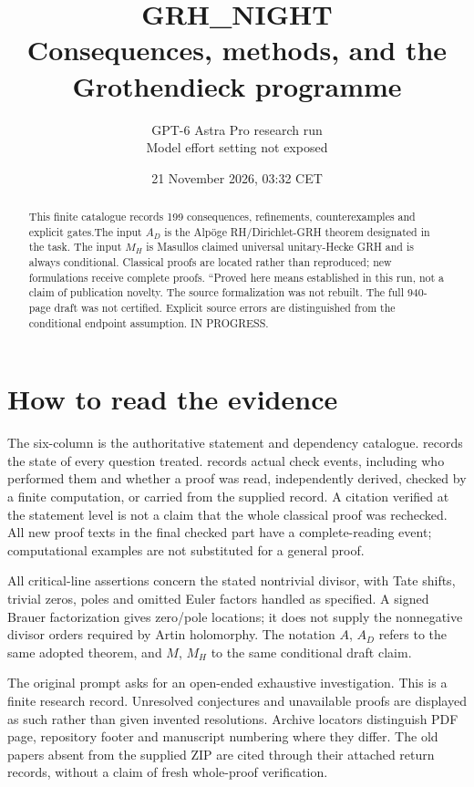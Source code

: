 \documentclass[11pt,a4paper]{article}
\title{\textbf{GRH\_NIGHT}\\Consequences, methods, and the Grothendieck programme}
\author{GPT-6 Astra Pro research run\\Model effort setting not exposed}
\date{21 November 2026, 03:\allowbreak{}32 CET}
\begin{document}
\maketitle
\begin{abstract}
This finite catalogue records 199 consequences, refinements, counterexamples and explicit gates.\allowbreak{}The input $A_D$ is the Alp\"oge RH/Dirichlet-GRH theorem designated in the task. The input $M_H$ is Masullo\textquotesingle s claimed universal unitary-Hecke GRH and is always conditional. Classical proofs are located rather than reproduced; new formulations receive complete proofs. ``Proved here means established in this run, not a claim of publication novelty. The source formalization was not rebuilt. The full 940-page draft was not certified. Explicit source errors are distinguished from the conditional endpoint assumption. IN PROGRESS.
\end{abstract}
\tableofcontents
\newpage
\section*{How to read the evidence}
The six-column  is the authoritative statement and
dependency catalogue.  records the state of every
question treated.  records actual check events,
including who performed them and whether a proof was read, independently
derived, checked by a finite computation, or carried from the supplied
record. A citation verified at the statement level is not a claim that the
whole classical proof was rechecked. All new proof texts in the final
checked part have a complete-reading event; computational examples are
not substituted for a general proof.

All critical-line assertions concern the stated nontrivial divisor, with
Tate shifts, trivial zeros, poles and omitted Euler factors handled as
specified. A signed Brauer factorization gives zero/pole locations; it
does not supply the nonnegative divisor orders required by Artin
holomorphy. The notation $A$, $A_D$ refers to the same adopted theorem,
and $M$, $M_H$ to the same conditional draft claim.

The original prompt asks for an open-ended exhaustive investigation.
This is a finite research record. Unresolved conjectures and unavailable
proofs are displayed as such rather than given invented resolutions.
Archive locators distinguish PDF page, repository footer and manuscript
numbering where they differ. The old papers absent from the supplied ZIP
are cited through their attached return records, without a claim of fresh
whole-proof verification.
\end{document}
